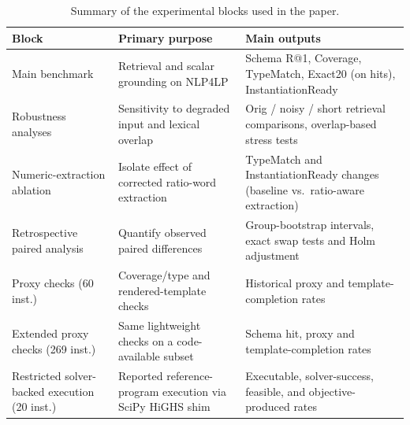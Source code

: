 \documentclass[pdflatex,sn-basic,Numbered]{sn-jnl}
\begin{document}
\begin{table}[htbp]
\centering
\caption{Summary of the experimental blocks used in the paper.}
\label{tab:exp_blocks}
\small
\begin{tabularx}{\linewidth}{X X X}
\toprule
Block & Primary purpose & Main outputs \\
\midrule
Main benchmark & Retrieval and scalar grounding on \textsc{NLP4LP} & Schema R@1, Coverage, TypeMatch, Exact20 (on hits), InstantiationReady \\
Robustness analyses & Sensitivity to degraded input and lexical overlap & Orig / noisy / short retrieval comparisons, overlap-based stress tests \\
Numeric-extraction ablation & Isolate effect of corrected ratio-word extraction & TypeMatch and InstantiationReady changes (baseline vs.\ ratio-aware extraction) \\
Retrospective paired analysis & Quantify observed paired differences & Group-bootstrap intervals, exact swap tests and Holm adjustment \\
Proxy checks (60 inst.) & Coverage/type and rendered-template checks & Historical proxy and template-completion rates \\
Extended proxy checks (269 inst.) & Same lightweight checks on a code-available subset & Schema hit, proxy and template-completion rates \\
Restricted solver-backed execution (20 inst.) & Reported reference-program execution via SciPy HiGHS shim & Executable, solver-success, feasible, and objective-produced rates \\
\bottomrule
\end{tabularx}
\end{table}
\FloatBarrier
\end{document}
